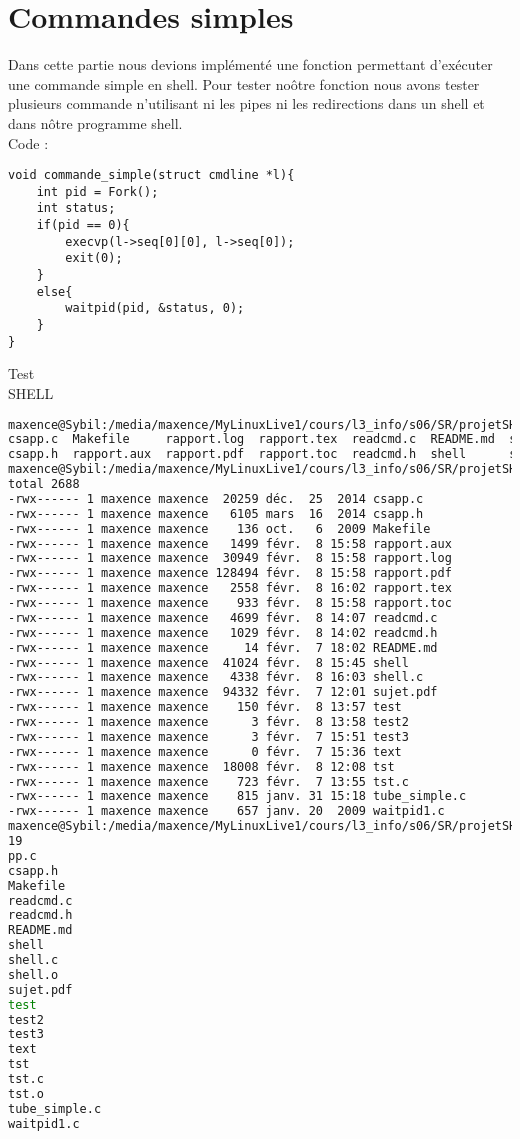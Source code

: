 \documentclass{report}
\begin{document}
		\section{Commandes simples}
		Dans cette partie nous devions impl\'ement\'e une fonction permettant d'ex\'ecuter une commande simple en shell. Pour tester no\^otre fonction nous avons tester plusieurs commande n'utilisant ni les pipes ni les redirections dans un shell et dans n\^otre programme shell. \\
		Code :
		\begin{lstlisting}
void commande_simple(struct cmdline *l){
	int pid = Fork();
	int status;
	if(pid == 0){
		execvp(l->seq[0][0], l->seq[0]);
		exit(0);
	}
	else{
		waitpid(pid, &status, 0);
	}
}
		\end{lstlisting} 
		Test \\ SHELL
		\begin{lstlisting}[frame=single,basicstyle=\footnotesize,language=bash]
maxence@Sybil:/media/maxence/MyLinuxLive1/cours/l3_info/s06/SR/projetSHELL$ ls
csapp.c  Makefile     rapport.log  rapport.tex  readcmd.c  README.md  shell.c    test   test3  tst    tube_simple.c
csapp.h  rapport.aux  rapport.pdf  rapport.toc  readcmd.h  shell      sujet.pdf  test2  text   tst.c  waitpid1.c
maxence@Sybil:/media/maxence/MyLinuxLive1/cours/l3_info/s06/SR/projetSHELL$ ls -l
total 2688
-rwx------ 1 maxence maxence  20259 déc.  25  2014 csapp.c
-rwx------ 1 maxence maxence   6105 mars  16  2014 csapp.h
-rwx------ 1 maxence maxence    136 oct.   6  2009 Makefile
-rwx------ 1 maxence maxence   1499 févr.  8 15:58 rapport.aux
-rwx------ 1 maxence maxence  30949 févr.  8 15:58 rapport.log
-rwx------ 1 maxence maxence 128494 févr.  8 15:58 rapport.pdf
-rwx------ 1 maxence maxence   2558 févr.  8 16:02 rapport.tex
-rwx------ 1 maxence maxence    933 févr.  8 15:58 rapport.toc
-rwx------ 1 maxence maxence   4699 févr.  8 14:07 readcmd.c
-rwx------ 1 maxence maxence   1029 févr.  8 14:02 readcmd.h
-rwx------ 1 maxence maxence     14 févr.  7 18:02 README.md
-rwx------ 1 maxence maxence  41024 févr.  8 15:45 shell
-rwx------ 1 maxence maxence   4338 févr.  8 16:03 shell.c
-rwx------ 1 maxence maxence  94332 févr.  7 12:01 sujet.pdf
-rwx------ 1 maxence maxence    150 févr.  8 13:57 test
-rwx------ 1 maxence maxence      3 févr.  8 13:58 test2
-rwx------ 1 maxence maxence      3 févr.  7 15:51 test3
-rwx------ 1 maxence maxence      0 févr.  7 15:36 text
-rwx------ 1 maxence maxence  18008 févr.  8 12:08 tst
-rwx------ 1 maxence maxence    723 févr.  7 13:55 tst.c
-rwx------ 1 maxence maxence    815 janv. 31 15:18 tube_simple.c
-rwx------ 1 maxence maxence    657 janv. 20  2009 waitpid1.c
maxence@Sybil:/media/maxence/MyLinuxLive1/cours/l3_info/s06/SR/projetSHELL$ cat test
19
pp.c
csapp.h
Makefile
readcmd.c
readcmd.h
README.md
shell
shell.c
shell.o
sujet.pdf
test
test2
test3
text
tst
tst.c
tst.o
tube_simple.c
waitpid1.c
		\end{lstlisting}
\end{document}
